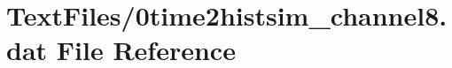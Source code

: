 \hypertarget{0time2histsim__channel8_8dat}{}\section{Text\+Files/0time2histsim\+\_\+channel8.dat File Reference}
\label{0time2histsim__channel8_8dat}
